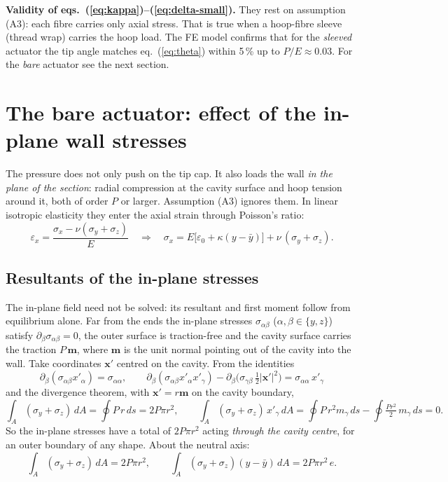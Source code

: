\documentclass[11pt,a4paper]{article}
\numberwithin{equation}{section}
\begin{document}
\begin{keyresult}
\textbf{Validity of eqs.~(\ref{eq:kappa})--(\ref{eq:delta-small}).} They rest on assumption (A3): each fibre carries only axial stress.
That is true when a hoop-fibre sleeve (thread wrap) carries the hoop load. The FE model confirms that for the \emph{sleeved} actuator the tip angle matches
eq.~(\ref{eq:theta}) within 5\,\% up to $P/E\approx 0.03$. For the \emph{bare} actuator see the next section.
\end{keyresult}

\section{The bare actuator: effect of the in-plane wall stresses}\label{sec:poisson}

The pressure does not only push on the tip cap. It also loads the wall \emph{in the plane of the section}: radial compression
at the cavity surface and hoop tension around it, both of order $P$ or larger. Assumption (A3) ignores them.
In linear isotropic elasticity they enter the axial strain through Poisson's ratio:
\begin{equation}
\varepsilon_x = \frac{\sigma_x - \nu(\sigma_y+\sigma_z)}{E}
\quad\Longrightarrow\quad
\sigma_x = E\big[\varepsilon_0 + \kappa(y-\bar y)\big] + \nu\,(\sigma_y+\sigma_z). \label{eq:hooke}
\end{equation}

\subsection{Resultants of the in-plane stresses}
The in-plane field need not be solved: its resultant and first moment follow from equilibrium alone.
Far from the ends the in-plane stresses $\sigma_{\alpha\beta}$ ($\alpha,\beta\in\{y,z\}$) satisfy $\partial_\beta\sigma_{\alpha\beta}=0$, the outer surface is traction-free and the cavity surface
carries the traction $P\,\bm m$, where $\bm m$ is the unit normal pointing out of the cavity into the wall. Take coordinates $\bm x'$ centred on the cavity. From the identities
\[
\partial_\beta(\sigma_{\alpha\beta}x'_\alpha) = \sigma_{\alpha\alpha},\qquad
\partial_\beta(\sigma_{\alpha\beta}x'_\alpha x'_\gamma) - \partial_\beta\!\big(\sigma_{\gamma\beta}\,\tfrac12|\bm x'|^2\big) = \sigma_{\alpha\alpha}\,x'_\gamma
\]
and the divergence theorem, with $\bm x' = r\bm m$ on the cavity boundary,
\begin{equation}
\int_A(\sigma_y+\sigma_z)\,dA = \oint P\,r\,ds = 2P\pi r^2,\qquad
\int_A(\sigma_y+\sigma_z)\,x'_\gamma\,dA = \oint P\,r^2 m_\gamma\,ds - \oint \tfrac{P r^2}{2}\, m_\gamma\,ds = 0 .
\end{equation}
So the in-plane stresses have a total of $2P\pi r^2$ acting \emph{through the cavity centre}, for an outer boundary of any shape.
About the neutral axis:
\begin{equation}
\int_A(\sigma_y+\sigma_z)\,dA = 2P\pi r^2,\qquad \int_A(\sigma_y+\sigma_z)(y-\bar y)\,dA = 2P\pi r^2\,e .
\end{equation}
\end{document}
